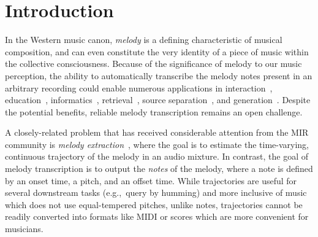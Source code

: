 \section{Introduction}\label{sec:introduction}

In the Western music canon, 
\emph{melody} is a defining characteristic of musical composition, 
and can even constitute the very identity of a piece of music within the collective consciousness. 
Because of the significance of melody to our music perception, 
the ability to automatically transcribe the melody notes present in an arbitrary recording 
could enable numerous applications in 
interaction~\cite{ryynanen2008accompaniment}, 
education~\cite{droe2006music}, 
informatics~\cite{bainbridge1999towards}, 
retrieval~\cite{ghias1995query}, 
source separation~\cite{ewert2014score},
and generation~\cite{hawthorne2019enabling}.
Despite the potential benefits, 
reliable melody transcription remains an open challenge.

A closely-related problem that has received considerable attention from the MIR community is \emph{melody extraction}~\cite{goto1999real,goto2004real,salamon2014melody,rao2022melody}, where the goal is to estimate the time-varying, continuous \fnot{} trajectory of the melody in an audio mixture. 
In contrast, the goal of melody transcription is to output the \emph{notes} of the melody, where a note is defined by an onset time, a pitch, and an offset time. 
While \fnot{} trajectories are useful for several downstream tasks (e.g.,~query by humming) and more inclusive of music which does not use equal-tempered pitches, unlike notes, trajectories cannot be readily converted into formats like MIDI or scores which are more convenient for musicians.

